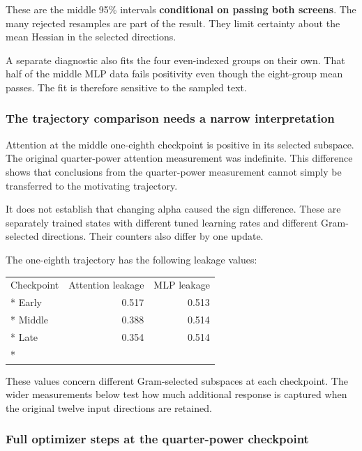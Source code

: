 \documentclass[
  14pt,
  letterpaper,
]{extarticle}
\newcounter{none} %
\begin{document}
These are the middle 95\% intervals \textbf{conditional on passing both
screens}. The many rejected resamples are part of the result. They limit
certainty about the mean Hessian in the selected directions.

A separate diagnostic also fits the four even-indexed groups on their
own. That half of the middle MLP data fails positivity even though the
eight-group mean passes. The fit is therefore sensitive to the sampled
text.

\subsubsection{The trajectory comparison needs a narrow
interpretation}\label{the-trajectory-comparison-needs-a-narrow-interpretation}

Attention at the middle one-eighth checkpoint is positive in its
selected subspace. The original quarter-power attention measurement was
indefinite. This difference shows that conclusions from the
quarter-power measurement cannot simply be transferred to the motivating
trajectory.

It does not establish that changing alpha caused the sign difference.
These are separately trained states with different tuned learning rates
and different Gram-selected directions. Their counters also differ by
one update.

The one-eighth trajectory has the following leakage values:

{\def\LTcaptype{none} %
\begin{longtable}[]{@{}lrr@{}}
\toprule\noalign{}
Checkpoint & Attention leakage & MLP leakage \\*
\midrule\noalign{}
\endhead
\bottomrule\noalign{}
\endlastfoot
Early & 0.517 & 0.513 \\*
Middle & 0.388 & 0.514 \\*
Late & 0.354 & 0.514 \\*
\end{longtable}
}

These values concern different Gram-selected subspaces at each
checkpoint. The wider measurements below test how much additional
response is captured when the original twelve input directions are
retained.

\subsubsection{Full optimizer steps at the quarter-power
checkpoint}\label{full-optimizer-steps-at-the-quarter-power-checkpoint}
\end{document}
